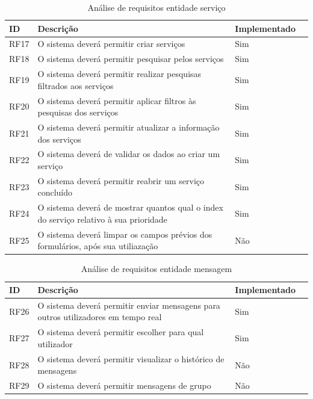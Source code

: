 \documentclass[a4paper,12pt]{article} %
\begin{document}
\begin{table}[H]
	\centering
	\begin{tabular}{|l|p{12cm}|l|r|}
		\hline
		\textbf{ID} & \textbf{Descrição} & \textbf{Implementado}\\
		\hline
		RF17 & O sistema deverá permitir criar serviços & Sim \\
		\hline
		RF18 & O sistema deverá permitir pesquisar pelos serviços & Sim \\
		\hline
		RF19 & O sistema deverá permitir realizar pesquisas filtrados aos serviços & Sim \\
		\hline
		RF20 & O sistema deverá permitir aplicar filtros às pesquisas dos serviços & Sim \\
		\hline
		RF21 & O sistema deverá permitir atualizar a informação dos serviços & Sim \\
		\hline
		RF22 & O sistema deverá de validar os dados ao criar um serviço & Sim \\
		\hline
		RF23 & O sistema deverá permitir reabrir um serviço concluído & Sim \\
		\hline
		RF24 & O sistema deverá de mostrar quantos qual o index do serviço relativo à sua prioridade & Sim \\
		\hline
		RF25 & O sistema deverá limpar os campos prévios dos formulários, após sua utiliazação & Não \\
		\hline
	\end{tabular}
	\caption{Análise de requisitos entidade serviço}
\end{table}

\begin{table}[H]
	\centering
	\begin{tabular}{|l|p{12cm}|l|r|}
		\hline
		\textbf{ID} & \textbf{Descrição} & \textbf{Implementado}\\
		\hline
		RF26 & O sistema deverá permitir enviar mensagens para outros utilizadores em tempo real & Sim \\
		\hline
		RF27 & O sistema deverá permitir escolher para qual utilizador & Sim \\
		\hline
		RF28 & O sistema deverá permitir visualizar o histórico de mensagens & Não \\
		\hline
		RF29 & O sistema deverá permitir mensagens de grupo & Não \\
		\hline
	\end{tabular}
	\caption{Análise de requisitos entidade mensagem}
\end{table}
\end{document}
